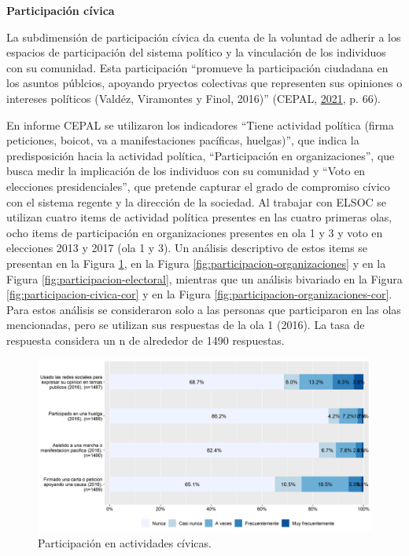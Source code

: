 \documentclass[
  12pt,
]{book}
\begin{document}
\textbf{Participación cívica}

La subdimensión de participación cívica da cuenta de la voluntad de adherir a los espacios de participación del sistema político y la vinculación de los individuos con su comunidad. Esta participación ``promueve la participación ciudadana en los asuntos públcios, apoyando pryectos colectivas que representen sus opiniones o intereses políticos (Valdéz, Viramontes y Finol, 2016)'' (CEPAL, \protect\hyperlink{ref-cepal_cohesion_2021}{2021}, p. 66).

En informe CEPAL se utilizaron los indicadores ``Tiene actividad política (firma peticiones, boicot, va a manifestaciones pacíficas, huelgas)'', que indica la predisposición hacia la actividad política, ``Participación en organizaciones'', que busca medir la implicación de los individuos con su comunidad y ``Voto en elecciones presidenciales'', que pretende capturar el grado de compromiso cívico con el sistema regente y la dirección de la sociedad. Al trabajar con ELSOC se utilizan cuatro items de actividad política presentes en las cuatro primeras olas, ocho items de participación en organizaciones presentes en ola 1 y 3 y voto en elecciones 2013 y 2017 (ola 1 y 3). Un análisis descriptivo de estos items se presentan en la Figura \ref{fig:participacion-civica}, en la Figura \ref{fig:participacion-organizaciones} y en la Figura \ref{fig:participacion-electoral}, mientras que un análisis bivariado en la Figura \ref{fig:participacion-civica-cor} y en la Figura \ref{fig:participacion-organizaciones-cor}. Para estos análisis se consideraron solo a las personas que participaron en las olas mencionadas, pero se utilizan sus respuestas de la ola 1 (2016). La tasa de respuesta considera un n de alrededor de 1490 respuestas.

\begin{figure}[H]

{\centering \includegraphics[width=1\linewidth,height=1\textheight]{output/graphs/participacion-civica} 

}

\caption{Participación en actividades cívicas.}\label{fig:participacion-civica}
\end{figure}
\end{document}
